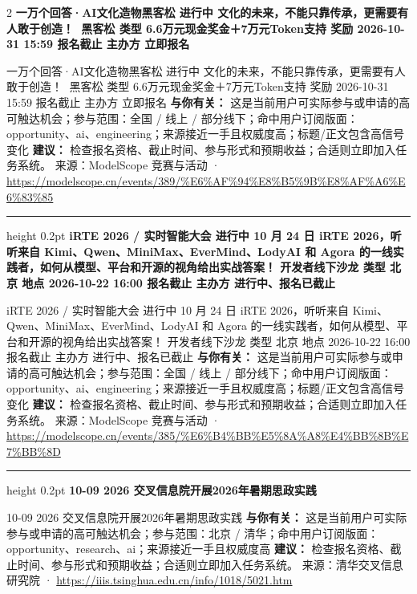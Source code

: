 \documentclass[10.5pt]{ctexart}
\begin{document}
\begin{multicols}{2}
{\large\bfseries 一万个回答·AI文化造物黑客松 进行中 文化的未来，不能只靠传承，更需要有人敢于创造！👋 黑客松 类型 6.6万元现金奖金＋7万元Token支持 奖励 2026-10-31 15:59 报名截止 主办方 立即报名}\par
一万个回答·AI文化造物黑客松 进行中 文化的未来，不能只靠传承，更需要有人敢于创造！👋 黑客松 类型 6.6万元现金奖金＋7万元Token支持 奖励 2026-10-31 15:59 报名截止 主办方 立即报名
\textbf{与你有关：} 这是当前用户可实际参与或申请的高可触达机会；参与范围：全国 / 线上 / 部分线下；命中用户订阅版面：opportunity、ai、engineering；来源接近一手且权威度高；标题/正文包含高信号变化
\textbf{建议：} 检查报名资格、截止时间、参与形式和预期收益；合适则立即加入任务系统。
{\footnotesize\color{ormuted} 来源：ModelScope 竞赛与活动 · \url{https://modelscope.cn/events/389/%E6%AF%94%E8%B5%9B%E8%AF%A6%E6%83%85}}
\vspace{2mm}
\hrule height 0.2pt
\vspace{2mm}
{\large\bfseries iRTE 2026 / 实时智能大会 进行中 10 月 24 日 iRTE 2026，听听来自 Kimi、Qwen、MiniMax、EverMind、LodyAI 和 Agora 的一线实践者，如何从模型、平台和开源的视角给出实战答案！ 开发者线下沙龙 类型 北京 地点 2026-10-22 16:00 报名截止 主办方 进行中、报名已截止}\par
iRTE 2026 / 实时智能大会 进行中 10 月 24 日 iRTE 2026，听听来自 Kimi、Qwen、MiniMax、EverMind、LodyAI 和 Agora 的一线实践者，如何从模型、平台和开源的视角给出实战答案！ 开发者线下沙龙 类型 北京 地点 2026-10-22 16:00 报名截止 主办方 进行中、报名已截止
\textbf{与你有关：} 这是当前用户可实际参与或申请的高可触达机会；参与范围：全国 / 线上 / 部分线下；命中用户订阅版面：opportunity、ai、engineering；来源接近一手且权威度高；标题/正文包含高信号变化
\textbf{建议：} 检查报名资格、截止时间、参与形式和预期收益；合适则立即加入任务系统。
{\footnotesize\color{ormuted} 来源：ModelScope 竞赛与活动 · \url{https://modelscope.cn/events/385/%E6%B4%BB%E5%8A%A8%E4%BB%8B%E7%BB%8D}}
\vspace{2mm}
\hrule height 0.2pt
\vspace{2mm}
{\large\bfseries 10-09 2026 交叉信息院开展2026年暑期思政实践}\par
10-09 2026 交叉信息院开展2026年暑期思政实践
\textbf{与你有关：} 这是当前用户可实际参与或申请的高可触达机会；参与范围：北京 / 清华；命中用户订阅版面：opportunity、research、ai；来源接近一手且权威度高
\textbf{建议：} 检查报名资格、截止时间、参与形式和预期收益；合适则立即加入任务系统。
{\footnotesize\color{ormuted} 来源：清华交叉信息研究院 · \url{https://iiis.tsinghua.edu.cn/info/1018/5021.htm}}

\end{multicols}
\end{document}
